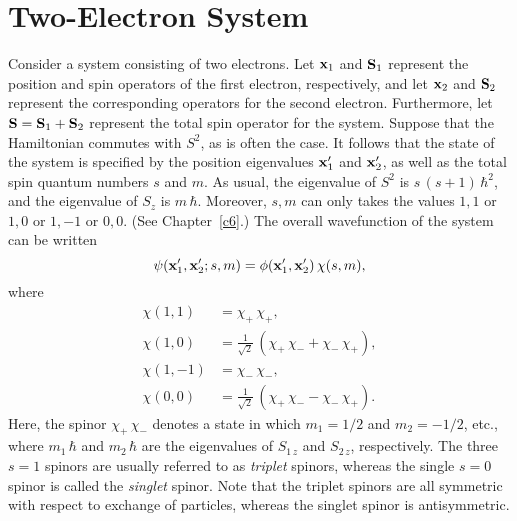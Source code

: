 \section{Two-Electron System}
Consider a system consisting of two electrons. Let ${\bf x}_1$ and ${\bf S}_1$ represent the position and spin operators of the first electron, respectively, 
and let ${\bf x}_2$ and ${\bf S}_2$ represent the corresponding operators for the second electron. Furthermore,
let ${\bf S}={\bf S}_1+{\bf S}_2$ represent the total spin operator for the system. Suppose that the Hamiltonian commutes with $S^{2}$, as is often the case.
It follows that the state of the system is specified by the position eigenvalues ${\bf x}_1'$ and ${\bf x}_2'$, as well as the total spin
quantum numbers $s$ and $m$. As usual, the eigenvalue of $S^{2}$ is $s\,(s+1)\,\hbar^2$, and the eigenvalue of $S_z$ is $m\,\hbar$. 
Moreover, $s, m$ can only takes the values $1,1$ or $1,0$ or $1,-1$ or $0,0$. (See Chapter~\ref{c6}.)
The overall wavefunction of the system can be written
\begin{equation}\label{e10.46t}
\psi({\bf x}_1',{\bf x}_2'; s,m) = \phi({\bf x}_1', {\bf x}_2')\,\chi(s,m),
\end{equation}
where
\begin{align}
\chi(1,1) &= \chi_+\,\chi_+,\\[0.5ex]
\chi(1,0)&= \frac{1}{\sqrt{2}}\,(\chi_+\,\chi_-+\chi_-\,\chi_+),\\[0.5ex]
\chi(1,-1)&=  \chi_-\,\chi_-,\\[0.5ex]
\chi(0,0) &= \frac{1}{\sqrt{2}}\,(\chi_+\,\chi_--\chi_-\,\chi_+).
\end{align}
Here, the spinor $\chi_+\,\chi_-$ denotes a state in which $m_1=1/2$ and $m_2=-1/2$, etc., where $m_1\,\hbar$ and $m_2\,\hbar$ are the eigenvalues
of  $S_{1\,z}$ and $S_{2\,z}$,  respectively. The three $s=1$ spinors are usually referred to as {\em triplet}\/ spinors, whereas the single
$s=0$ spinor is called the {\em singlet}\/ spinor. Note that the triplet spinors are all symmetric with respect to exchange of particles, whereas the
singlet spinor is antisymmetric. 

